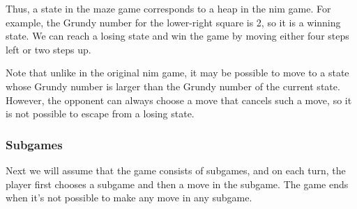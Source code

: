 \begin{center}
\end{center}

Thus, a state in the maze game
corresponds to a heap in the nim game.
For example, the Grundy number for
the lower-right square is 2,
so it is a winning state.
We can reach a losing state and
win the game by moving
either four steps left or
two steps up.

Note that unlike in the original nim game,
it may be possible to move to a state whose
Grundy number is larger than the Grundy number
of the current state.
However, the opponent can always choose a move
that cancels such a move, so it is not possible
to escape from a losing state.

\subsubsection{Subgames}

Next we will assume that the game consists
of subgames, and on each turn, the player
first chooses a subgame and then a move in the subgame.
The game ends when it's not possible to make any move
in any subgame.

